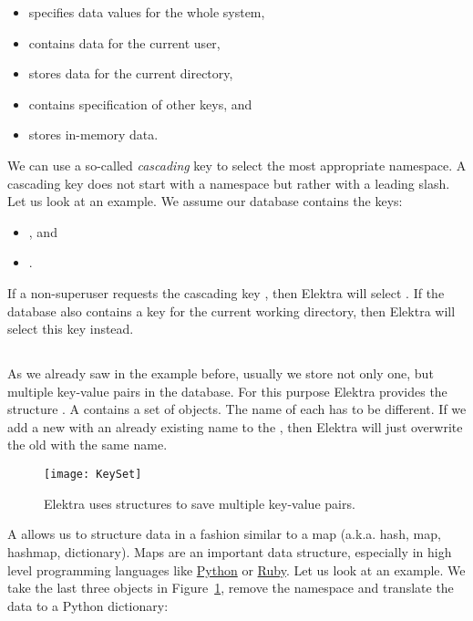 \begin{itemize}[style=multiline, leftmargin=1.8cm]
  \item [\code{system}] specifies data values for the whole system,
  \item [\code{user}] contains data for the current user,
  \item [\code{dir}] stores data for the current directory,
  \item [\code{spec}] contains specification of other keys, and
  \item [\code{proc}] stores in-memory data.
\end{itemize}

We can use a so-called \emph{cascading} key to select the most appropriate namespace. A cascading key does not start with a namespace but rather with a leading slash. Let us look at an example. We assume our database contains the keys:

\begin{itemize}
  \item {}, and
  \item {}.
\end{itemize}

If a non-superuser requests the cascading key , then Elektra will select . If the database also contains a key  for the current working directory, then Elektra will select this key instead.

\subsection{}
\label{sec:keyset}

As we already saw in the example before, usually we store not only one, but multiple key-value pairs in the database. For this purpose Elektra provides the structure . A  contains a set of  objects. The name of each  has to be different. If we add a new  with an already existing name to the , then Elektra will just overwrite the old  with the same name.

\begin{figure}
  \centering
    \texttt{[image: KeySet]}
  \caption{Elektra uses  structures to save multiple key-value pairs.}
  \label{fig:keyset}
\end{figure}

A  allows us to structure data in a fashion similar to a map (a.k.a. hash, map, hashmap, dictionary). Maps are an important data structure, especially in high level programming languages like \href{https://www.python.org}{Python} or \href{https://www.ruby-lang.org}{Ruby}. Let us look at an example. We take the last three  objects in Figure~\ref{fig:keyset}, remove the namespace and translate the data to a Python dictionary:

